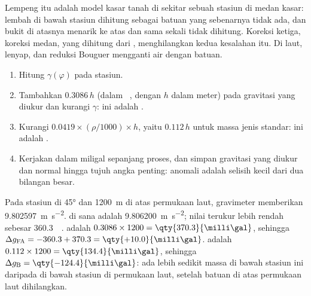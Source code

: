 Lempeng itu adalah model kasar tanah di sekitar sebuah stasiun di medan kasar: lembah di bawah stasiun dihitung sebagai batuan yang sebenarnya tidak ada, dan bukit di atasnya menarik ke atas dan sama sekali tidak dihitung. Koreksi ketiga, koreksi medan, yang dihitung dari , menghilangkan kedua kesalahan itu. Di laut,  lenyap, dan reduksi Bouguer mengganti air dengan batuan.

\begin{method}\label{met:b1:isostasy-gravity:reduction}
\begin{enumerate}
  \item Hitung  $\gamma(\varphi)$ pada  stasiun.
  \item Tambahkan  $0.3086\,h$ (dalam \unit{\milli\gal}, dengan $h$ dalam meter) pada gravitasi yang diukur dan kurangi $\gamma$: ini adalah .
  \item Kurangi  $0.0419\times(\rho/1000)\times h$, yaitu
        $0.112\,h$ untuk massa jenis standar: ini adalah .
  \item Kerjakan dalam miligal sepanjang proses, dan simpan gravitasi yang diukur dan normal hingga tujuh angka penting: anomali adalah selisih kecil dari dua bilangan besar.
\end{enumerate}
\end{method}

\begin{example}\label{ex:b1:isostasy-gravity:reduction}
Pada stasiun di  \ang{45} dan \qty{1200}{m} di atas permukaan laut, gravimeter memberikan \qty{9.802597}{m.s^{-2}}.  di sana adalah \qty{9.806200}{m.s^{-2}}; nilai terukur lebih rendah sebesar \qty{360.3}{\milli\gal}.  adalah $0.3086\times1200 = \qty{370.3}{\milli\gal}$, sehingga $\Delta g_{\mathrm{FA}} = -360.3 + 370.3 = \qty{+10.0}{\milli\gal}$.  adalah $0.112\times1200 = \qty{134.4}{\milli\gal}$, sehingga $\Delta g_{\mathrm B}
= \qty{-124.4}{\milli\gal}$: ada lebih sedikit massa di bawah stasiun ini daripada di bawah stasiun di permukaan laut, setelah batuan di atas permukaan laut dihilangkan.
\end{example}

